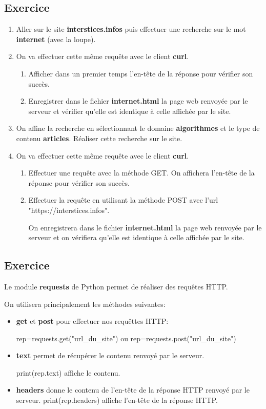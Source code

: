 \documentclass[11pt,a4paper]{article}
\newcounter{numexo}
\begin{document}
\subsection*{\Large Exercice \thenumexo}
\begin{enumerate}
\item Aller sur le site \textbf{interstices.infos} puis effectuer une recherche sur le mot \textbf{internet} (avec la loupe).
\item On va effectuer cette même requête avec le client \textbf{curl}.
\begin{enumerate}
\item Afficher dans un premier temps l'en-tête de la réponse pour vérifier son succès.
\item Enregistrer dans le fichier \textbf{internet.html} la page web renvoyée par le serveur et vérifier qu'elle est identique à celle affichée par le site.
\end{enumerate}
\item On affine la recherche en sélectionnant le domaine \textbf{algorithmes} et le type de contenu \textbf{articles}. Réaliser cette recherche sur le site.
\item On va effectuer cette même requête avec le client \textbf{curl}.
\begin{enumerate}
\item Effectuer une requête avec la méthode GET. On affichera l'en-tête de la réponse pour vérifier son succès.
\item Effectuer la requête en utilisant la méthode POST avec l'url "https://interstices.infos". 

On enregistrera dans le fichier \textbf{internet.html} la page web renvoyée par le serveur et on vérifiera qu'elle est identique à celle affichée par le site.
\end{enumerate}
\end{enumerate}


\newpage

\addtocounter{numexo}{1}
\subsection*{\Large Exercice \thenumexo}
Le module \textbf{requests} de Python permet de réaliser des requêtes HTTP. 

On utilisera principalement les méthodes suivantes:
\begin{itemize}
\item \textbf{get} et \textbf{post} pour effectuer nos requêttes HTTP:

rep=requests.get("url\_du\_site") ou rep=requests.post("url\_du\_site")

\item \textbf{text} permet de récupérer le contenu renvoyé par le serveur.

print(rep.text) affiche le contenu.

\item \textbf{headers} donne le contenu de l'en-tête de la réponse HTTP renvoyé par le serveur.
print(rep.headers) affiche l'en-tête de la réponse HTTP.
\end{itemize}
\end{document}
